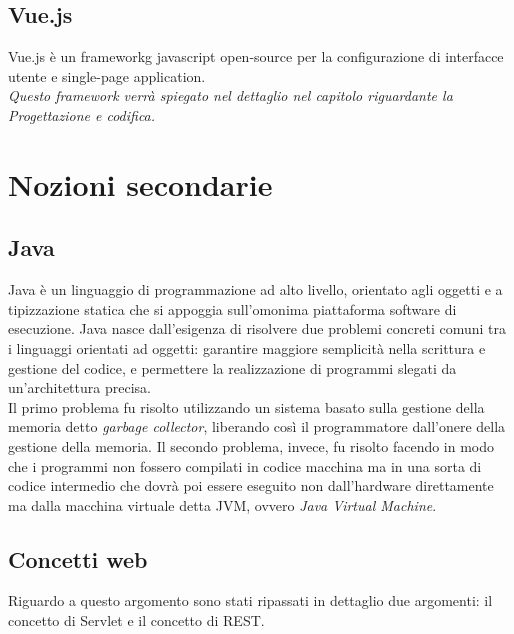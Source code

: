 \subsection{Vue.js}
\label{subsec:vue.js}

Vue.js è un \gls{frameworkg} javascript open-source per la configurazione di interfacce utente e single-page application.\\

\textit{Questo framework verrà spiegato nel dettaglio nel capitolo riguardante la Progettazione e codifica.}

\section{Nozioni secondarie}
\label{sec:nozioni-secondarie}

\subsection{Java}
\label{subsec:java}

Java è un linguaggio di programmazione ad alto livello, orientato agli oggetti e a tipizzazione statica che si appoggia sull'omonima piattaforma software di esecuzione. Java nasce dall'esigenza di risolvere due problemi concreti comuni tra i linguaggi orientati ad oggetti: garantire maggiore semplicità nella scrittura e gestione del codice, e permettere la realizzazione di programmi slegati da un'architettura precisa.\\
Il primo problema fu risolto utilizzando un sistema basato sulla gestione della memoria detto \textit{garbage collector}, liberando così il programmatore dall'onere della gestione della memoria. Il secondo problema, invece, fu risolto facendo in modo che i programmi non fossero compilati in codice macchina ma in una sorta di codice intermedio che dovrà poi essere eseguito non dall'hardware direttamente ma dalla macchina virtuale detta JVM, ovvero \textit{Java Virtual Machine}.\\

\subsection{Concetti web}
\label{subsec:concetti-web}

Riguardo a questo argomento sono stati ripassati in dettaglio due argomenti: il concetto di Servlet e il concetto di REST.

